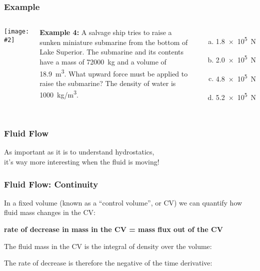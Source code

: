 \documentclass[12pt,aspectratio=169]{beamer}
\newcommand{\pic}[2]{\texttt{[image: \#2]}}
\newcommand{\eq}[2]{\vspace{#1}{\Large\begin{displaymath}#2\end{displaymath}}}
\begin{document}
\begin{frame}
  \frametitle{Example}

  \begin{columns}

    \pic{1}{hpa_b.jpg}

    \textbf{Example 4:} A salvage ship tries to raise a sunken miniature
    submarine from the bottom of Lake Superior. The submarine and its contents
    have a mass of \SI{72000}{kg} and a volume of \SI{18.9}{m^3}. What upward
    force must be applied to raise the submarine? The density of water is
    \SI{1000}{kg/m^3}.
    \begin{enumerate}[(a)]
    \item\SI{1.8e5}{\newton}
    \item\SI{2.0e5}{\newton}
    \item\SI{4.8e5}{\newton}
    \item\SI{5.2e5}{\newton}
    \end{enumerate}
    
  \end{columns}
\end{frame}



\begin{frame}
  \frametitle{Fluid Flow}

  \begin{center}
    As important as it is to understand hydrostatics,\\
    it's way more interesting when the fluid is moving!
  \end{center}
\end{frame}



\begin{frame}
  \frametitle{Fluid Flow: Continuity}
  In a fixed volume (known as a ``control volume'', or CV) we can quantify how
  fluid mass changes in the CV:
  \begin{center}
    \textbf{rate of decrease in mass in the CV = mass flux out of the CV}
  \end{center}

  The fluid mass in the CV is the integral of density over the volume:

  \eq{-.2in}{ \int_{CV}\rho dV }
  
  The rate of decrease is therefore the negative of the time derivative:
  
  \eq{-.25in}{
    -\frac{\partial}{\partial t}\int_{CV}\rho dV
  }
\end{frame}
\end{document}
